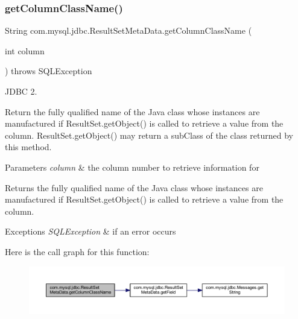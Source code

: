 \subsubsection{\texorpdfstring{get\+Column\+Class\+Name()}{getColumnClassName()}}
{\footnotesize\ttfamily String com.\+mysql.\+jdbc.\+Result\+Set\+Meta\+Data.\+get\+Column\+Class\+Name (\begin{DoxyParamCaption}\item[{int}]{column }\end{DoxyParamCaption}) throws S\+Q\+L\+Exception}

J\+D\+BC 2.

Return the fully qualified name of the Java class whose instances are manufactured if Result\+Set.\+get\+Object() is called to retrieve a value from the column. Result\+Set.\+get\+Object() may return a sub\+Class of the class returned by this method. 


\begin{DoxyParams}{Parameters}
{\em column} & the column number to retrieve information for\\
\hline
\end{DoxyParams}
\begin{DoxyReturn}{Returns}
the fully qualified name of the Java class whose instances are manufactured if Result\+Set.\+get\+Object() is called to retrieve a value from the column.
\end{DoxyReturn}

\begin{DoxyExceptions}{Exceptions}
{\em S\+Q\+L\+Exception} & if an error occurs \\
\hline
\end{DoxyExceptions}
Here is the call graph for this function\+:
\nopagebreak
\begin{figure}[H]
\begin{center}
\leavevmode
\includegraphics[width=350pt]{classcom_1_1mysql_1_1jdbc_1_1_result_set_meta_data_af666c44dbef9b1dd62cdd4710807f34d_cgraph}
\end{center}
\end{figure}
\mbox{\label{classcom_1_1mysql_1_1jdbc_1_1_result_set_meta_data_ad0b42106871ff26619d003a63fdff531}} 
